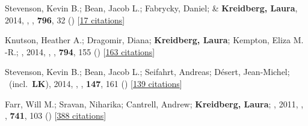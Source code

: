 \item[{\color{numcolor}\scriptsize4}] Stevenson, Kevin B.; Bean, Jacob L.; Fabrycky, Daniel; \& \textbf{Kreidberg, Laura}, 2014, , \apj, \textbf{796}, 32 () [\href{https://ui.adsabs.harvard.edu/abs/2014ApJ...796...32S}{17 citations}]

\item[{\color{numcolor}\scriptsize3}] Knutson, Heather A.; Dragomir, Diana; \textbf{Kreidberg, Laura}; Kempton, Eliza M. -R.; \etal, 2014, , \apj, \textbf{794}, 155 () [\href{https://ui.adsabs.harvard.edu/abs/2014ApJ...794..155K}{163 citations}]

\item[{\color{numcolor}\scriptsize2}] Stevenson, Kevin B.; Bean, Jacob L.; Seifahrt, Andreas; D{\'e}sert, Jean-Michel; \etal\ (incl.\ \textbf{LK}), 2014, , \aj, \textbf{147}, 161 () [\href{https://ui.adsabs.harvard.edu/abs/2014AJ....147..161S}{139 citations}]

\item[{\color{numcolor}\scriptsize1}] Farr, Will M.; Sravan, Niharika; Cantrell, Andrew; \textbf{Kreidberg, Laura}; \etal, 2011, , \apj, \textbf{741}, 103 () [\href{https://ui.adsabs.harvard.edu/abs/2011ApJ...741..103F}{388 citations}]